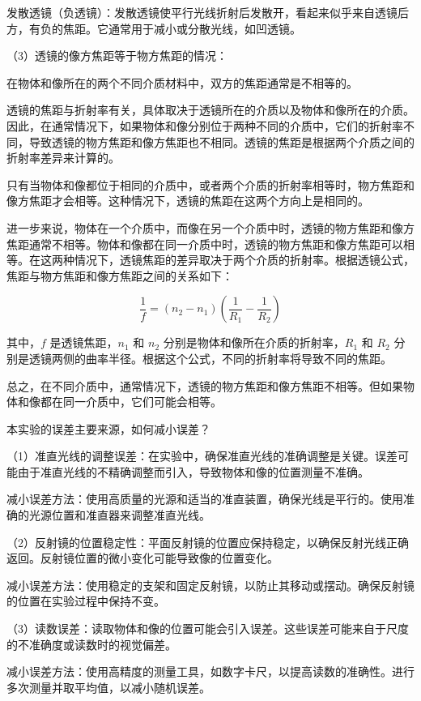 \documentclass[dvipsnames, svgnames,a4paper,11pt]{article}
\begin{document}
	发散透镜（负透镜）：发散透镜使平行光线折射后发散开，看起来似乎来自透镜后方，有负的焦距。它通常用于减小或分散光线，如凹透镜。
	
	（3）透镜的像方焦距等于物方焦距的情况：
	
	在物体和像所在的两个不同介质材料中，双方的焦距通常是不相等的。
	
	透镜的焦距与折射率有关，具体取决于透镜所在的介质以及物体和像所在的介质。因此，在通常情况下，如果物体和像分别位于两种不同的介质中，它们的折射率不同，导致透镜的物方焦距和像方焦距也不相同。透镜的焦距是根据两个介质之间的折射率差异来计算的。
	
	只有当物体和像都位于相同的介质中，或者两个介质的折射率相等时，物方焦距和像方焦距才会相等。这种情况下，透镜的焦距在这两个方向上是相同的。
	
	进一步来说，物体在一个介质中，而像在另一个介质中时，透镜的物方焦距和像方焦距通常不相等。物体和像都在同一介质中时，透镜的物方焦距和像方焦距可以相等。在这两种情况下，透镜焦距的差异取决于两个介质的折射率。根据透镜公式，焦距与物方焦距和像方焦距之间的关系如下：
	
	\[
	\frac{1}{f} = (n_2 - n_1) \left( \frac{1}{R_1} - \frac{1}{R_2} \right)
	\]
	
	其中，\(f\) 是透镜焦距，\(n_1\) 和 \(n_2\) 分别是物体和像所在介质的折射率，\(R_1\) 和 \(R_2\) 分别是透镜两侧的曲率半径。根据这个公式，不同的折射率将导致不同的焦距。
	
	总之，在不同介质中，通常情况下，透镜的物方焦距和像方焦距不相等。但如果物体和像都在同一介质中，它们可能会相等。
	
	\begin{question}
		本实验的误差主要来源，如何减小误差？
	\end{question}
	
	（1）准直光线的调整误差：在实验中，确保准直光线的准确调整是关键。误差可能由于准直光线的不精确调整而引入，导致物体和像的位置测量不准确。
	
	减小误差方法：使用高质量的光源和适当的准直装置，确保光线是平行的。使用准确的光源位置和准直器来调整准直光线。
	
	（2）反射镜的位置稳定性：平面反射镜的位置应保持稳定，以确保反射光线正确返回。反射镜位置的微小变化可能导致像的位置变化。
	
	减小误差方法：使用稳定的支架和固定反射镜，以防止其移动或摆动。确保反射镜的位置在实验过程中保持不变。
	
	（3）读数误差：读取物体和像的位置可能会引入误差。这些误差可能来自于尺度的不准确度或读数时的视觉偏差。
	
	减小误差方法：使用高精度的测量工具，如数字卡尺，以提高读数的准确性。进行多次测量并取平均值，以减小随机误差。
	
\end{document}
